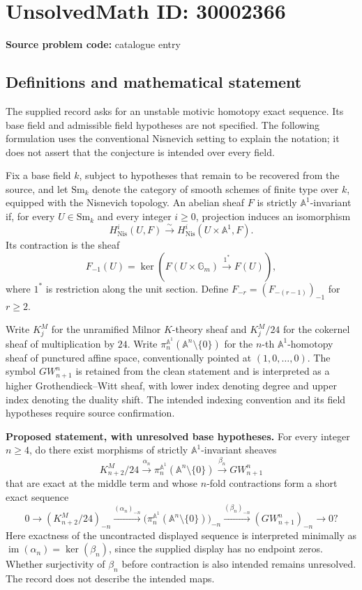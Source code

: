 \documentclass[11pt]{article}
\begin{document}
\section*{UnsolvedMath ID: 30002366}
\textbf{Source problem code:} catalogue entry
\subsection{Definitions and mathematical statement}
The supplied record asks for an unstable motivic homotopy exact sequence. Its base field and admissible field hypotheses are not specified. The following formulation uses the conventional Nisnevich setting to explain the notation; it does not assert that the conjecture is intended over every field.

Fix a base field \(k\), subject to hypotheses that remain to be recovered from the source, and let \(\mathrm{Sm}_k\) denote the category of smooth schemes of finite type over \(k\), equipped with the Nisnevich topology. An abelian sheaf \(F\) is strictly \(\mathbb A^1\)-invariant if, for every \(U\in\mathrm{Sm}_k\) and every integer \(i\geq 0\), projection induces an isomorphism
\[
H^i_{\mathrm{Nis}}(U,F)\xrightarrow{\sim}H^i_{\mathrm{Nis}}(U\times\mathbb A^1,F).
\]
Its contraction is the sheaf
\[
F_{-1}(U)=\ker\!\left(F(U\times\mathbb G_m)\xrightarrow{1^*}F(U)\right),
\]
where \(1^*\) is restriction along the unit section. Define \(F_{-r}=(F_{-(r-1)})_{-1}\) for \(r\geq 2\).

Write \(K^M_j\) for the unramified Milnor \(K\)-theory sheaf and \(K^M_j/24\) for the cokernel sheaf of multiplication by \(24\). Write \(\pi_n^{\mathbb A^1}(\mathbb A^n\setminus\{0\})\) for the \(n\)-th \(\mathbb A^1\)-homotopy sheaf of punctured affine space, conventionally pointed at \((1,0,\ldots,0)\). The symbol \(GW_{n+1}^{n}\) is retained from the clean statement and is interpreted as a higher Grothendieck--Witt sheaf, with lower index denoting degree and upper index denoting the duality shift. The intended indexing convention and its field hypotheses require source confirmation.

\textbf{Proposed statement, with unresolved base hypotheses.} For every integer \(n\geq 4\), do there exist morphisms of strictly \(\mathbb A^1\)-invariant sheaves
\[
K^M_{n+2}/24\xrightarrow{\alpha_n}
\pi_n^{\mathbb A^1}(\mathbb A^n\setminus\{0\})
\xrightarrow{\beta_n}GW_{n+1}^{n}
\]
that are exact at the middle term and whose \(n\)-fold contractions form a short exact sequence
\[
0\longrightarrow (K^M_{n+2}/24)_{-n}
\xrightarrow{(\alpha_n)_{-n}}
\bigl(\pi_n^{\mathbb A^1}(\mathbb A^n\setminus\{0\})\bigr)_{-n}
\xrightarrow{(\beta_n)_{-n}}
(GW_{n+1}^{n})_{-n}
\longrightarrow 0?
\]
Here exactness of the uncontracted displayed sequence is interpreted minimally as \(\operatorname{im}(\alpha_n)=\ker(\beta_n)\), since the supplied display has no endpoint zeros. Whether surjectivity of \(\beta_n\) before contraction is also intended remains unresolved. The record does not describe the intended maps.
\end{document}
